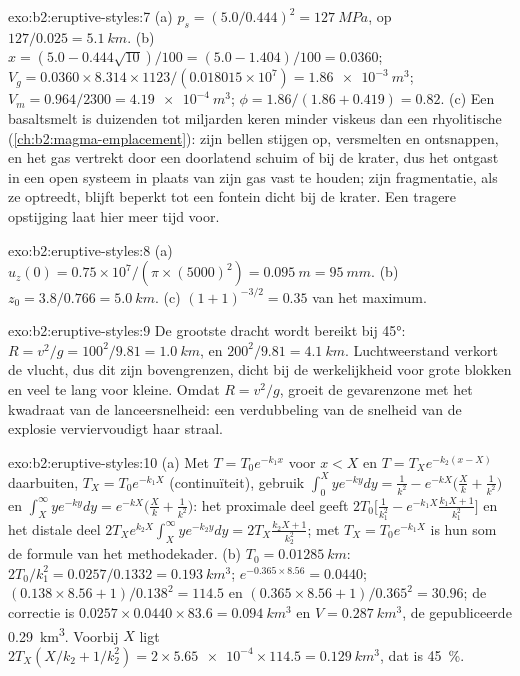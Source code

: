\begin{solution}{exo:b2:eruptive-styles:7}
(a) $p_s = (5.0/0.444)^2 = \qty{127}{MPa}$, op $127/0.025 = \qty{5.1}{km}$.
(b) $x = (5.0 - 0.444\sqrt{10})/100 = (5.0 - 1.404)/100 = 0.0360$;
$V_g = 0.0360\times8.314\times1123/(0.018015\times10^7) = \qty{1.86e-3}{m^3}$;
$V_m = 0.964/2300 = \qty{4.19e-4}{m^3}$; $\phi = 1.86/(1.86 + 0.419) = 0.82$.
(c) Een basaltsmelt is duizenden tot miljarden keren minder viskeus dan een
rhyolitische (\cref{ch:b2:magma-emplacement}): zijn bellen stijgen op,
versmelten en ontsnappen, en het gas vertrekt door een doorlatend schuim of bij de
krater, dus het  ontgast in een open systeem in plaats van zijn gas vast te houden; zijn
fragmentatie, als ze optreedt, blijft beperkt tot een fontein dicht bij de krater. Een tragere
opstijging laat hier meer tijd voor.
\end{solution}

\begin{solution}{exo:b2:eruptive-styles:8}
(a) $u_z(0) = 0.75\times10^7/(\pi\times(5000)^2) = \qty{0.095}{m} = \qty{95}{mm}$.
(b) $z_0 = 3.8/0.766 = \qty{5.0}{km}$. (c) $(1 + 1)^{-3/2} = 0.35$ van het
maximum.
\end{solution}

\begin{solution}{exo:b2:eruptive-styles:9}
De grootste dracht wordt bereikt bij \ang{45}: $R = v^2/g = 100^2/9.81 = \qty{1.0}{km}$, en
$200^2/9.81 = \qty{4.1}{km}$. Luchtweerstand verkort de vlucht, dus dit zijn
bovengrenzen, dicht bij de werkelijkheid voor grote blokken en veel te lang voor kleine.
Omdat $R = v^2/g$, groeit de gevarenzone met het kwadraat van de lanceersnelheid:
een verdubbeling van de snelheid van de explosie verviervoudigt haar straal.
\end{solution}

\begin{solution}{exo:b2:eruptive-styles:10}
(a) Met $T = T_0e^{-k_1x}$ voor $x < X$ en $T = T_Xe^{-k_2(x - X)}$ daarbuiten, $T_X =
T_0e^{-k_1X}$ (continuïteit), gebruik $\int_0^X ye^{-ky}dy = \frac{1}{k^2} - e^{-kX}\big(\frac{X}{k} +
\frac{1}{k^2}\big)$ en $\int_X^\infty ye^{-ky}dy = e^{-kX}\big(\frac{X}{k} +
\frac{1}{k^2}\big)$:
het proximale deel geeft $2T_0\big[\frac{1}{k_1^2} - e^{-k_1X}\frac{k_1X + 1}{k_1^2}\big]$ en het
distale deel $2T_Xe^{k_2X}\int_X^\infty ye^{-k_2y}dy = 2T_X\frac{k_2X + 1}{k_2^2}$; met $T_X =
T_0e^{-k_1X}$ is hun som de formule van het methodekader.
(b) $T_0 = \qty{0.01285}{km}$: $2T_0/k_1^2 = 0.0257/0.1332 = \qty{0.193}{km^3}$;
$e^{-0.365\times8.56} = 0.0440$; $(0.138\times8.56 + 1)/0.138^2 = 114.5$ en
$(0.365\times8.56 + 1)/0.365^2 = 30.96$; de correctie is $0.0257\times0.0440\times83.6
= \qty{0.094}{km^3}$ en $V = \qty{0.287}{km^3}$, de gepubliceerde \qty{0.29}{km^3}.
Voorbij $X$ ligt $2T_X(X/k_2 + 1/k_2^2) = 2\times\num{5.65e-4}\times114.5 =
\qty{0.129}{km^3}$, dat is \qty{45}{\percent}.
\end{solution}

